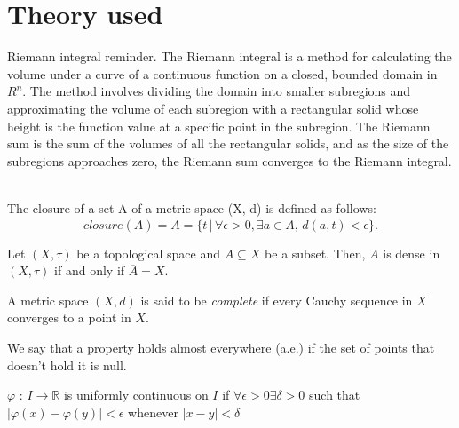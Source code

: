 \documentclass[../main.tex]{subfiles}
\begin{document}
\appendix

\chapter{ Theory used} \label{apx:purification_with_noise}

\begin{definition} Riemann integral reminder. 
The Riemann integral is a method for calculating the volume under a curve of a continuous function on a closed, bounded domain in $R^n$. The method involves dividing the domain into smaller subregions and approximating the volume of each subregion with a rectangular solid whose height is the function value at a specific point in the subregion. The Riemann sum is the sum of the volumes of all the rectangular solids, and as the size of the subregions approaches zero, the Riemann sum converges to the Riemann integral. \\ \\
\end{definition}

\begin{definition}The closure of a set A of a metric space (X, d) is defined as follows:
	$$closure(A) = \overline{A}=\{t \, |  \, \forall \epsilon> 0, \exists a \in A, \, d(a, t) < \epsilon\}.$$
\end{definition}

\begin{propo}
 Let $(X,\tau)$ be a topological space and $A\subseteq X$ be a subset. Then, $A$ is dense in $(X,\tau)$ if and only if $\overline{A}=X$.
\end{propo}

\begin{definition} A metric space $(X,d)$ is said to be \emph{complete} if every Cauchy sequence in $X$ converges to a point in $X$. 
\end{definition}

\begin{definition}
We say that a property holds almost everywhere (a.e.) if the set of points that doesn’t hold it is null.
\end{definition}


\begin{definition} 
	$\varphi$ : $I \rightarrow \mathbb{R}$ is uniformly continuous on $I$ if $\forall \epsilon > 0 \exists \delta >0 $ such that $|\varphi(x)- \varphi(y)| < \epsilon$ whenever $|x-y|< \delta$
\end{definition}
\end{document}
